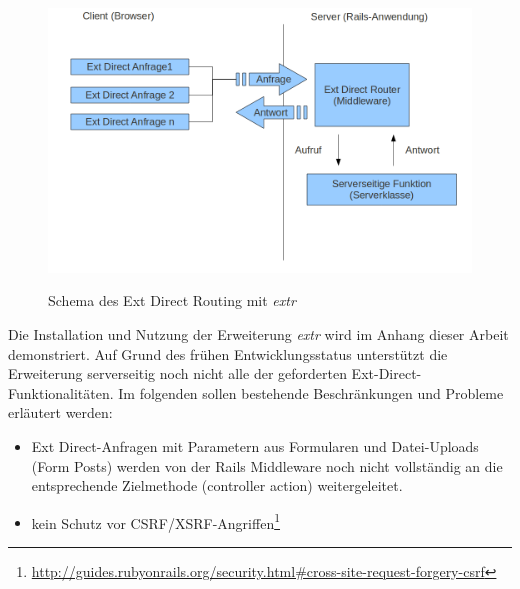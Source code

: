 \begin{figure}[!ht]
\begin{center}
\label{fig.directrouter}
\includegraphics[scale=0.3]{images/rack/extdirect.png}
\caption{Schema des Ext Direct Routing mit \emph{extr}}
\end{center}
\end{figure}

Die Installation und Nutzung der Erweiterung \emph{extr} wird im Anhang dieser Arbeit demonstriert. Auf Grund des frühen Entwicklungsstatus unterstützt die Erweiterung serverseitig noch nicht alle der geforderten Ext-Direct-Funktionalitäten. Im folgenden sollen bestehende Beschränkungen und Probleme erläutert werden:
\begin{itemize}
\item
Ext Direct-Anfragen mit Parametern aus Formularen und Datei-Uploads (Form Posts) werden von der Rails Middleware noch nicht vollständig an die entsprechende Zielmethode (controller action) weitergeleitet.
\item
kein Schutz vor CSRF/XSRF-Angriffen\footnote{\href{http://guides.rubyonrails.org/security.html\#cross-site-request-forgery-csrf}{http://guides.rubyonrails.org/security.html\#cross-site-request-forgery-csrf}}
\end{itemize}

